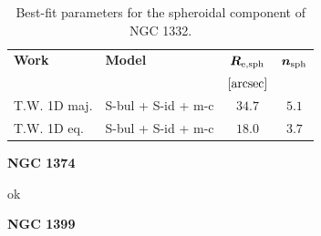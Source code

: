 \documentclass[preprint2]{emulateapj}
\begin{document}
  \begin{table}[h]
  \small
  \caption{Best-fit parameters for the spheroidal component of NGC 1332.}
  \begin{center}
  \begin{tabular}{llcc}
  \hline
  {\bf Work} & {\bf Model}   & $\bm R_{\rm e,sph}$    & $\bm n_{\rm sph}$ \\
    &  &  $[\rm arcsec]$ & \\
  \hline
  T.W. 1D maj. & S-bul + S-id + m-c & $34.7$  &  $5.1$ \\
  T.W. 1D eq.  & S-bul + S-id + m-c & $18.0$  &  $3.7$ \\
  \hline
  \end{tabular}
  \end{center}
  \label{tab:n1332}
  \end{table}

  \clearpage\newpage\noindent
  {\bf NGC 1374 \\}

  ok

  \clearpage\newpage\noindent
  {\bf NGC 1399 \\}
  
\end{document}
